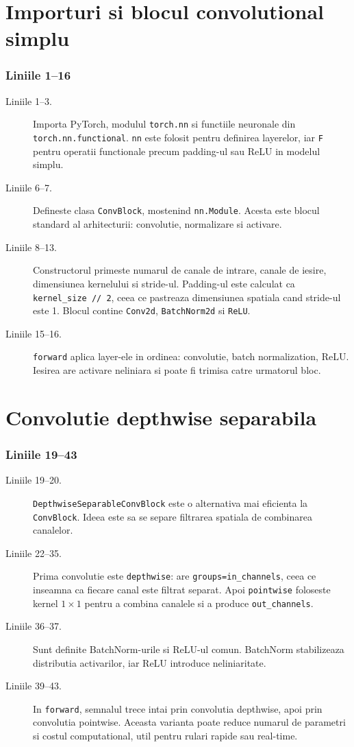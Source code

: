 \documentclass[12pt,a4paper]{report}
\newcommand{\codechunk}[2]{%
\subsection*{Liniile #1--#2}

}
\begin{document}
\chapter{Importuri si blocul convolutional simplu}

\codechunk{1}{16}

\begin{description}
    \item[Liniile 1--3.] Importa PyTorch, modulul \texttt{torch.nn} si functiile
    neuronale din \texttt{torch.nn.functional}. \texttt{nn} este folosit pentru
    definirea layerelor, iar \texttt{F} pentru operatii functionale precum
    padding-ul sau ReLU in modelul simplu.

    \item[Liniile 6--7.] Defineste clasa \texttt{ConvBlock}, mostenind
    \texttt{nn.Module}. Acesta este blocul standard al arhitecturii: convolutie,
    normalizare si activare.

    \item[Liniile 8--13.] Constructorul primeste numarul de canale de intrare,
    canale de iesire, dimensiunea kernelului si stride-ul. Padding-ul este calculat
    ca \texttt{kernel\_size // 2}, ceea ce pastreaza dimensiunea spatiala cand
    stride-ul este 1. Blocul contine \texttt{Conv2d}, \texttt{BatchNorm2d} si
    \texttt{ReLU}.

    \item[Liniile 15--16.] \texttt{forward} aplica layer-ele in ordinea:
    convolutie, batch normalization, ReLU. Iesirea are activare neliniara si poate
    fi trimisa catre urmatorul bloc.
\end{description}

\chapter{Convolutie depthwise separabila}

\codechunk{19}{43}

\begin{description}
    \item[Liniile 19--20.] \texttt{DepthwiseSeparableConvBlock} este o alternativa
    mai eficienta la \texttt{ConvBlock}. Ideea este sa se separe filtrarea spatiala
    de combinarea canalelor.

    \item[Liniile 22--35.] Prima convolutie este \texttt{depthwise}: are
    \texttt{groups=in\_channels}, ceea ce inseamna ca fiecare canal este filtrat
    separat. Apoi \texttt{pointwise} foloseste kernel \(1 \times 1\) pentru a
    combina canalele si a produce \texttt{out\_channels}.

    \item[Liniile 36--37.] Sunt definite BatchNorm-urile si ReLU-ul comun. BatchNorm
    stabilizeaza distributia activarilor, iar ReLU introduce neliniaritate.

    \item[Liniile 39--43.] In \texttt{forward}, semnalul trece intai prin convolutia
    depthwise, apoi prin convolutia pointwise. Aceasta varianta poate reduce
    numarul de parametri si costul computational, util pentru rulari rapide sau
    real-time.
\end{description}
\end{document}
